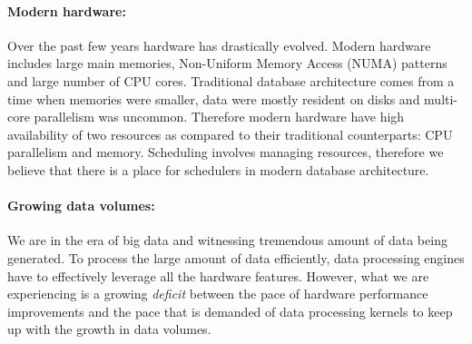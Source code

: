 \paragraph{Modern hardware:} 
Over the past few years hardware has drastically evolved. 
Modern hardware includes large main memories, Non-Uniform Memory Access (NUMA) patterns and large number of CPU cores.
Traditional database architecture comes from a time when memories were smaller, data were mostly resident on disks and multi-core parallelism was uncommon. 
Therefore modern hardware have high availability of two resources as compared to their traditional counterparts: CPU parallelism and memory.
Scheduling involves managing resources, therefore we believe that there is a place for schedulers in modern database architecture. 
\paragraph{Growing data volumes:}
We are in the era of big data and witnessing tremendous amount of data being generated.
To process the large amount of data efficiently, data processing engines have to effectively leverage all the hardware features. 
However, what we are experiencing is a growing \textit{deficit} between the pace of hardware performance improvements and the pace that is demanded of data processing kernels to keep up with the growth in data volumes.

